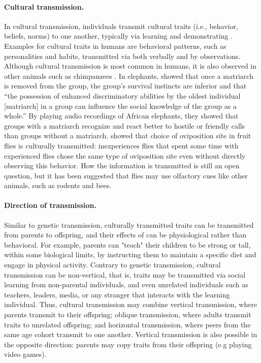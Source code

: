 \documentclass[12pt]{extarticle}
\begin{document}
\paragraph{Cultural transmission.}
In cultural transmission, individuals transmit cultural traits (i.e., behavior, beliefs, norms) to one another, typically via learning and demonstrating \citep{transmissionVectorsBook}.
Examples for cultural traits in humans are behavioral patterns, such as personalities and habits, transmitted via both verbally and by observations. %
Although cultural transmission is most common in humans, it is also observed in other animals such as chimpanzees \citep{chimpsPrestige, chimpsCopy}. %
In elephants, \citet{elepahntsRepo} showed that once a matriarch is removed from the group, the group's survival instincts are inferior and that ``the possession of enhanced discriminatory abilities by the oldest individual [matriarch] in a group can influence the social knowledge of the group as a whole.''
By playing audio recordings of African elephants, they showed that groups with a matriarch recognize and react better to hostile or friendly calls than groups without a matriarch.
\citet{fliesPaper} showed that choice of oviposition site in fruit flies is culturally transmitted: inexperiences flies that spent some time with experienced flies chose the same type of oviposition site even without directly observing this behavior. How the information is transmitted is still an open question, but it has been suggested that flies may use olfactory cues like other animals, such as rodents and bees.

\paragraph{Direction of transmission.}
Similar to genetic transmission, culturally transmitted traits can be transmitted from parents to offspring, and their effects of can be physiological rather than behavioral.
For example, parents can "teach" their children to be strong or tall, within some biological limits, by instructing them to maintain a specific diet and engage in physical activity.
Contrary to genetic transmission, cultural transmission can be non-vertical, that is, traits may be transmitted via social learning from non-parental individuals, and even unrelated individuals such as teachers, leaders, media, or any stranger that interacts with the learning individual.
Thus, cultural transmission may combine vertical transmission, where parents transmit to their offspring; oblique transmission, where adults transmit traits to unrelated offspring; and horizontal transmission, where peers from the same age cohort transmit to one another. 
Vertical transmission is also possible in the opposite direction: parents may copy traits from their offspring (e.g playing video games)\citep{transmissionVectorsBook,transmissionVectors}.  %
\end{document}
